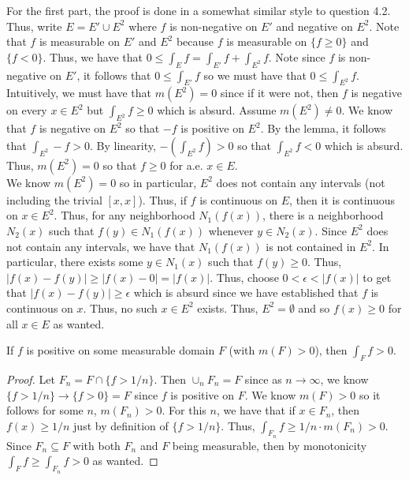 \documentclass[12pt]{article}
\newenvironment{lemma}[2][Lemma]{\begin{trivlist}
\item[\hskip \labelsep {\bfseries #1}\hskip \labelsep {\bfseries #2.}]}{\end{trivlist}}
\newenvironment{solution}[2][Solution]{\begin{trivlist}
\item[\hskip \labelsep {\bfseries #1}]}{\end{trivlist}}
\begin{document}
\begin{solution}
    FFor the first part, the proof is done in a somewhat similar style to question 4.2. Thus, write $E = E' \cup E^2$ where
    $f$ is non-negative on $E'$ and negative on $E^2$. Note that $f$ is measurable on $E'$ and $E^2$ because $f$ is measurable on
    $\{f \geq 0\}$ and $\{f < 0\}$. Thus, we have that $0 \leq \int_E f = \int_{E'} f + \int_{E^2} f$. Note since $f$ is non-negative
    on $E'$, it follows that $0\leq \int_{E'} f$ so we must have that $0\leq \int_{E^2} f$. Intuitively, we must have that
    $m(E^2) = 0$ since if it were not, then $f$ is negative on every $x\in E^2$ but $\int_{E^2} f\geq 0$ which is absurd.
    Assume $m(E^2)\neq 0$. We know that $f$ is negative on $E^2$ so that $-f$ is positive on $E^2$. By the lemma, it follows
    that $\int_{E^2} -f > 0$. By linearity, $-(\int_{E^2} f) > 0$ so that $\int_{E^2} f < 0$ which is absurd. Thus, $m(E^2) = 0$
    so that $f\geq 0$ for a.e. $x\in E$.\\

    We know $m(E^2) = 0$ so in particular, $E^2$ does not contain any intervals (not including the trivial $[x,x]$). Thus,
    if $f$ is continuous on $E$, then it is continuous on $x\in E^2$. Thus, for any neighborhood $N_1(f(x))$, there is a neighborhood
    $N_2(x)$ such that $f(y)\in N_1(f(x))$ whenever $y\in N_2(x)$. Since $E^2$ does not contain any intervals, we have that
    $N_1(f(x))$ is not contained in $E^2$. In particular, there exists some $y\in N_1(x)$ such that $f(y)\geq 0$. Thus,
    $|f(x)-f(y)|\geq |f(x)-0| = |f(x)|$. Thus, choose $0 < \epsilon < |f(x)|$ to get that $|f(x)-f(y)|\geq \epsilon$ which is absurd
    since we have established that $f$ is continuous on $x$. Thus, no such $x\in E^2$ exists. Thus, $E^2 = \emptyset$ and so
    $f(x)\geq 0$ for all $x\in E$ as wanted.
\end{solution}

\begin{lemma}
    IIf $f$ is positive on some measurable domain $F$ (with $m(F)>0$), then $\int_F f > 0$.
\end{lemma}
\begin{proof}
    Let $F_n = F \cap \{f > 1/n\}$. Then $\cup_n F_n = F$ since as $n\to\infty$, we know $\{f > 1/n\}\to \{f>0\} = F$
    since $f$ is positive on $F$. We know $m(F)>0$ so it follows for some $n$, $m(F_n)>0$. For this $n$, we have that
    if $x\in F_n$, then $f(x) \geq 1/n$ just by definition of $\{f > 1/n\}$. Thus, $\int_{F_n} f \geq 1/n\cdot m(F_n) > 0$.
    Since $F_n\subseteq F$ with both $F_n$ and $F$ being measurable, then by monotonicity $\int_F f \geq \int_{F_n} f > 0$ as wanted.
\end{proof}
\end{document}
